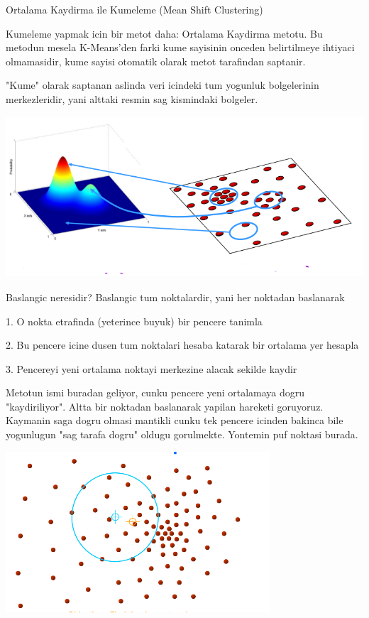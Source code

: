 \documentclass[12pt,fleqn]{article}\usepackage{../common}
\begin{document}
Ortalama Kaydirma ile Kumeleme (Mean Shift Clustering)

Kumeleme yapmak icin bir metot daha: Ortalama Kaydirma metotu. Bu
metodun mesela K-Means'den farki kume sayisinin onceden belirtilmeye
ihtiyaci olmamasidir, kume sayisi otomatik olarak metot tarafindan
saptanir.

"Kume" olarak saptanan aslinda veri icindeki tum yogunluk bolgelerinin
merkezleridir, yani alttaki resmin sag kismindaki bolgeler. 

\includegraphics[height=6cm]{dist.png}

Baslangic neresidir? Baslangic tum noktalardir, yani her noktadan
baslanarak

1. O nokta etrafinda (yeterince buyuk) bir pencere tanimla

2. Bu pencere icine dusen tum noktalari hesaba katarak bir ortalama yer hesapla

3. Pencereyi yeni ortalama noktayi merkezine alacak sekilde kaydir

Metotun ismi buradan geliyor, cunku pencere yeni ortalamaya dogru
"kaydiriliyor". Altta bir noktadan baslanarak yapilan hareketi
goruyoruz.  Kaymanin saga dogru olmasi mantikli cunku tek pencere
icinden bakinca bile yogunlugun "sag tarafa dogru" oldugu
gorulmekte. Yontemin puf noktasi burada.

\includegraphics[height=6cm]{mean_2.png}
\end{document}
